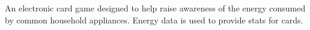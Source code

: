 \documentclass[a4paper]{deedy-resume} %
\begin{document}
\begin{minipage}[t]{0.66\textwidth}
\sectionspace %



An electronic card game designed to help raise awareness of the energy consumed by common household appliances. Energy data is used to provide stats for cards.%
\sectionspace %









\end{minipage}
\end{document}

